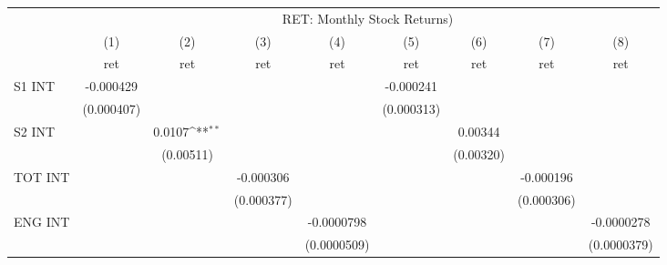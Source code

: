 {
\def\sym#1{\ifmmode^{#1}\else\(^{#1}\)\fi}
\begin{tabular}{l*{8}{c}}
\hline\hline
                    &\multicolumn{8}{c}{RET: Monthly Stock Returns) }                                                                                                                               \\\cmidrule(lr){2-9}
                    &\multicolumn{1}{c}{(1)}&\multicolumn{1}{c}{(2)}&\multicolumn{1}{c}{(3)}&\multicolumn{1}{c}{(4)}&\multicolumn{1}{c}{(5)}&\multicolumn{1}{c}{(6)}&\multicolumn{1}{c}{(7)}&\multicolumn{1}{c}{(8)}\\
                    &\multicolumn{1}{c}{ret}&\multicolumn{1}{c}{ret}&\multicolumn{1}{c}{ret}&\multicolumn{1}{c}{ret}&\multicolumn{1}{c}{ret}&\multicolumn{1}{c}{ret}&\multicolumn{1}{c}{ret}&\multicolumn{1}{c}{ret}\\
\hline
S1 INT              &   -0.000429         &                     &                     &                     &   -0.000241         &                     &                     &                     \\
                    &  (0.000407)         &                     &                     &                     &  (0.000313)         &                     &                     &                     \\
S2 INT              &                     &      0.0107\sym{**} &                     &                     &                     &     0.00344         &                     &                     \\
                    &                     &   (0.00511)         &                     &                     &                     &   (0.00320)         &                     &                     \\
TOT INT             &                     &                     &   -0.000306         &                     &                     &                     &   -0.000196         &                     \\
                    &                     &                     &  (0.000377)         &                     &                     &                     &  (0.000306)         &                     \\
ENG INT             &                     &                     &                     &  -0.0000798         &                     &                     &                     &  -0.0000278         \\
                    &                     &                     &                     & (0.0000509)         &                     &                     &                     & (0.0000379)         \\

\end{tabular}}
